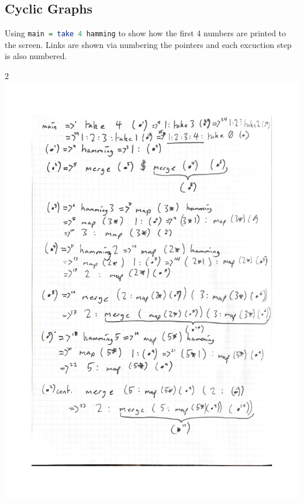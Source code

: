 \documentclass[a4paper]{article}
\begin{document}
\subsection{Cyclic Graphs}
Using \lstinline[language = haskell]{main = take 4 hamming} to show how the first 4 numbers are printed to the screen.
Links are shown via numbering the pointers and each excuction step is also numbered.
\begin{center}
    \begin{multicols}{2}
        \includegraphics[scale=0.45]{HammingCycle1.pdf}

\end{multicols}
\end{center}
\end{document}
